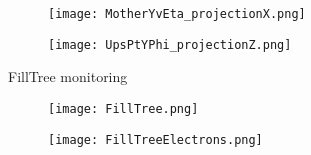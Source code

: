 \documentclass{beamer}
\begin{document}
\begin{frame}
  \begin{figure}[h!]
  \centering
  \texttt{[image: MotherYvEta\_projectionX.png]}
  \end{figure}
\end{frame}

\begin{frame}
  \begin{figure}[h!]
  \centering
  \texttt{[image: UpsPtYPhi\_projectionZ.png]}
  \end{figure}
\end{frame}

\begin{frame}
  \begin{center}
 	\Huge FillTree monitoring
 	\end{center}
\end{frame}

\begin{frame}
  \begin{figure}[h!]
  \centering
  \texttt{[image: FillTree.png]}
  \end{figure}
\end{frame}

\begin{frame}
  \begin{figure}[h!]
  \centering
  \texttt{[image: FillTreeElectrons.png]}
  \end{figure}
\end{frame}




\end{document}
